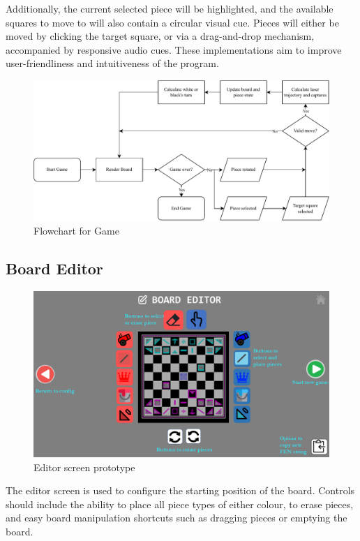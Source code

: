 \documentclass[../main/main.tex]{subfiles}
\begin{document}
Additionally, the current selected piece will be highlighted, and the available squares to move to will also contain a circular visual cue. Pieces will either be moved by clicking the target square, or via a drag-and-drop mechanism, accompanied by responsive audio cues. These implementations aim to improve user-friendliness and intuitiveness of the program.

\begin{figure}[H]
    \centering
    \includegraphics[width=\columnwidth]{../design/assets/game_flowchart.pdf}
    \caption{Flowchart for Game}
    \label{fig:game-flowchart}
\end{figure}

\subsection{Board Editor}
\begin{figure}[H]
    \centering
    \includegraphics[width=0.8\columnwidth]{../design/assets/editor_gui.png}
    \caption{Editor screen prototype}
    \label{fig:editor-gui}
\end{figure}

The editor screen is used to configure the starting position of the board. Controls should include the ability to place all piece types of either colour, to erase pieces, and easy board manipulation shortcuts such as dragging pieces or emptying the board.
\end{document}

